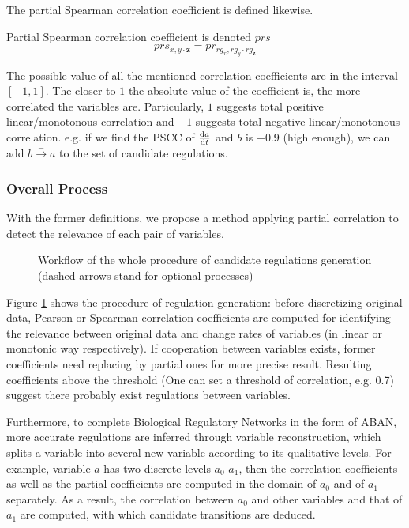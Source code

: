 The partial Spearman correlation coefficient is defined likewise.
\begin{definition}\label{def:PSCC}
Partial Spearman correlation coefficient is denoted $prs$
    $$prs_{x,y\cdot \mathbf {z}}=pr_{rg_x,rg_y\cdot rg_\mathbf {z}}$$%
\end{definition}

The possible value of all the mentioned correlation coefficients are in the interval $[-1,1]$.
The closer to $1$ the absolute value of the coefficient is, the more correlated the variables are.
Particularly, $1$ suggests total positive linear/monotonous correlation and $-1$ suggests total negative linear/monotonous correlation. 
e.g. if we find the PSCC of $\frac{{\rm d}a}{{\rm d}t}$ and $b$ is $-0.9$ (high enough), we can add $b\xrightarrow{-}a$ to the set of candidate regulations.

\subsubsection{Overall Process}

With the former definitions, we propose a method applying partial correlation to detect the relevance of each pair of variables.

\begin{figure}[ht]

\caption[Workflow of model inference via partial correlation]{Workflow of the whole procedure of candidate regulations generation (dashed arrows stand for optional processes)}\label{plan}
\end{figure}

Figure \ref{plan} shows the procedure of regulation generation: before discretizing original data, Pearson or Spearman correlation coefficients \cite{samaga2009logic,hauke2011comparison} are computed for identifying the relevance between original data and change rates of variables (in linear or monotonic way respectively). If cooperation between variables exists, former coefficients need replacing by partial ones \cite{de2004discovery} for more precise result.
Resulting coefficients above the threshold (One can set a threshold of correlation, e.g. 0.7) suggest there probably exist regulations between variables.

Furthermore, to complete Biological Regulatory Networks in the form of ABAN, more accurate regulations are inferred through variable reconstruction, which splits a variable into several new variable according to its qualitative levels.
For example, variable $a$ has two discrete levels $a_0$ $a_1$, then the correlation coefficients as well as the partial coefficients are computed in the domain of $a_0$ and of $a_1$ separately.
As a result, the correlation between $a_0$ and other variables and that of $a_1$ are computed, with which candidate transitions are deduced.


